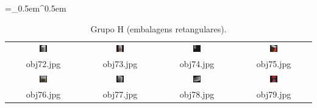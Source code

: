 \begin{table}[H]
  \centering
  \caption{Grupo H (embalagens retangulares).}
  \tabulinesep =_0.5em^0.5em
  \everyrow{\tabucline[0.4pt]-}
  \begin{tabu}{|cccc|}
    \includegraphics[width=0.1\textwidth,height=0.1\textwidth]{imagens/coil_100/embalagens_retangulares/obj9__30.png} &
    \includegraphics[width=0.1\textwidth,height=0.1\textwidth]{imagens/coil_100/embalagens_retangulares/obj22__0.png} &
    \includegraphics[width=0.1\textwidth,height=0.1\textwidth]{imagens/coil_100/embalagens_retangulares/obj22__0_1.png} &
    \includegraphics[width=0.1\textwidth,height=0.1\textwidth]{imagens/coil_100/embalagens_retangulares/obj39__55.png}
    \\
    \scriptsize{obj72.jpg} & \scriptsize{obj73.jpg} & \scriptsize{obj74.jpg} &
    \scriptsize{obj75.jpg}
    \\
    \includegraphics[width=0.1\textwidth,height=0.1\textwidth]{imagens/coil_100/embalagens_retangulares/obj55__0.png} &
    \includegraphics[width=0.1\textwidth,height=0.1\textwidth]{imagens/coil_100/embalagens_retangulares/obj65__50.png} &
    \includegraphics[width=0.1\textwidth,height=0.1\textwidth]{imagens/coil_100/embalagens_retangulares/obj65__50_1.png} &
    \includegraphics[width=0.1\textwidth,height=0.1\textwidth]{imagens/coil_100/embalagens_retangulares/obj90__0.png}
    \\
    \scriptsize{obj76.jpg} & \scriptsize{obj77.jpg} & \scriptsize{obj78.jpg} &
    \scriptsize{obj79.jpg}
  \end{tabu}
\end{table}

